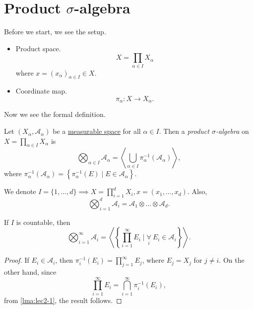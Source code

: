 \section{Product \(\sigma\)-algebra}
Before we start, we see the setup.
\begin{itemize}
	\item Product space.
	      \[
		      X = \prod_{\alpha \in I} X_\alpha
	      \]
	      where \(x = (x_\alpha )_{\alpha \in I}\in X\).
	\item Coordinate map.
	      \[
		      \pi _\alpha \colon X\to X_\alpha.
	      \]
\end{itemize}

Now we see the formal definition.
\begin{definition}\label{def:product-sigma-algebra}
	Let \((X_\alpha , \mathcal{A} _\alpha )\) be a \hyperref[def:measurable-space]{measurable space} for all \(\alpha \in I\).
	Then a \emph{product \(\sigma\)-algebra} on \(X = \prod_{\alpha \in I} X_\alpha \) is
	\[
		\bigotimes_{\alpha \in I}\mathcal{A} _\alpha = \left< \bigcup_{\alpha \in I} \pi ^{-1} _{\alpha }\left(\mathcal{A} _\alpha \right)  \right>,
	\]
	where \(\pi ^{-1} _\alpha \left(\mathcal{A} _\alpha \right) = \left\{\pi ^{-1} _\alpha (E) \mid E\in \mathcal{A} _\alpha \right\}\).
\end{definition}

\begin{notation}
	We denote \(I = \{1, \dots , d\} \implies X = \prod_{i=1}^{d} X_{i}, x = (x_1, \dots , x_d )\). Also,
	\[
		\bigotimes_{i = 1}^d \mathcal{A} _{i} = \mathcal{A} _1\otimes \dots \otimes \mathcal{A} _d.
	\]
\end{notation}

\begin{lemma}
	If \(I\) is countable, then
	\[
		\bigotimes_{i = 1}^{\infty}\mathcal{A} _{i} = \left< \left\{\prod_{i = 1}^{\infty} E_{i} \mid \underset{i}{\forall }\ E_{i}\in \mathcal{A} _{i}\right\} \right>.
	\]
\end{lemma}
\begin{proof}
	If \(E_i \in \mathcal{A} _{i}\), then \(\pi ^{-1} _{i} (E_{i} ) = \prod_{j=1}^{\infty } E_{j}\), where \(E_{j} = X_j\) for \(j\neq i\). On the other hand, since
	\[
		\prod_{i=1}^{\infty } E_{i} = \bigcap_{i=1}^{\infty } \pi ^{-1} _{i} (E_{i} ),
	\]
	from \autoref{lma:lec2-1}, the result follows.
\end{proof}
